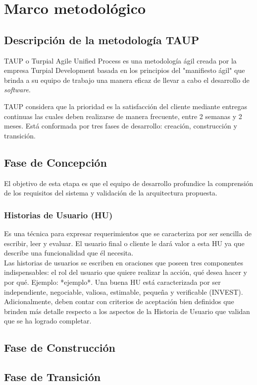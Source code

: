 \chapter{\textbf{Marco metodológico}}

\thispagestyle{empty}

\section{Descripción de la metodología TAUP}

TAUP o Turpial Agile Unified Process es una metodología ágil creada por la empresa Turpial Development basada en los principios del "manifiesto ágil" que brinda a su equipo de trabajo una manera eficaz de llevar a cabo el desarrollo de \textit{software}. 

TAUP considera que la prioridad es la satisfacción del cliente mediante entregas continuas las cuales deben realizarse de manera frecuente, entre 2 semanas y 2 meses. Está conformada por tres fases de desarrollo: creación, construcción y transición.

\section{Fase de Concepción}

El objetivo de esta etapa es que el equipo de desarrollo profundice la
comprensión de los requisitos del sistema y validación de la arquitectura propuesta. 

\subsection{Historias de Usuario (HU)}

Es una técnica para expresar requerimientos que se caracteriza por ser sencilla de escribir, leer y evaluar. El usuario final o cliente le dará valor a esta HU ya que describe una funcionalidad que él necesita.\\

Las historias de usuarios se escriben en oraciones que poseen tres componentes indispensables: el rol del usuario que quiere realizar la acción, qué desea hacer y por qué. Ejemplo: *ejemplo*. Una buena HU está caracterizada por ser independiente, negociable, valiosa, estimable, pequeña y verificable (INVEST).\\

Adicionalmente, deben contar con criterios de aceptación bien definidos que brinden más detalle respecto a los aspectos de la Historia de Usuario que validan que se ha logrado completar. 

\section{Fase de Construcción}

\section{Fase de Transición}